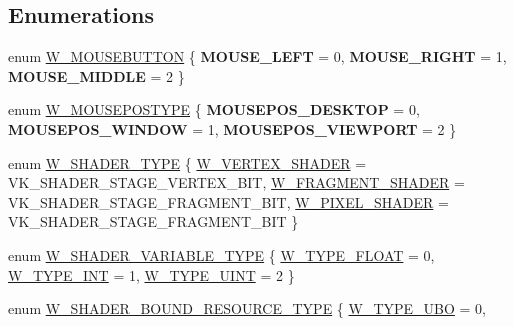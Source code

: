 \subsection*{Enumerations}
\begin{DoxyCompactItemize}
\item 
enum \hyperlink{group__engineclass_ga9e78ddd4770694b21c0d4b852e9c800e}{W\+\_\+\+M\+O\+U\+S\+E\+B\+U\+T\+T\+ON} \{ {\bfseries M\+O\+U\+S\+E\+\_\+\+L\+E\+FT} = 0, 
{\bfseries M\+O\+U\+S\+E\+\_\+\+R\+I\+G\+HT} = 1, 
{\bfseries M\+O\+U\+S\+E\+\_\+\+M\+I\+D\+D\+LE} = 2
 \}
\item 
enum \hyperlink{group__engineclass_ga6b8628ac07d789a9caf635eb23728d04}{W\+\_\+\+M\+O\+U\+S\+E\+P\+O\+S\+T\+Y\+PE} \{ {\bfseries M\+O\+U\+S\+E\+P\+O\+S\+\_\+\+D\+E\+S\+K\+T\+OP} = 0, 
{\bfseries M\+O\+U\+S\+E\+P\+O\+S\+\_\+\+W\+I\+N\+D\+OW} = 1, 
{\bfseries M\+O\+U\+S\+E\+P\+O\+S\+\_\+\+V\+I\+E\+W\+P\+O\+RT} = 2
 \}
\item 
enum \hyperlink{group__engineclass_ga8a79e4a3a441c88450e176150102c7b7}{W\+\_\+\+S\+H\+A\+D\+E\+R\+\_\+\+T\+Y\+PE} \{ \hyperlink{group__engineclass_gga8a79e4a3a441c88450e176150102c7b7a931690c7bb781b1a1c0cfac827e2cacf}{W\+\_\+\+V\+E\+R\+T\+E\+X\+\_\+\+S\+H\+A\+D\+ER} = V\+K\+\_\+\+S\+H\+A\+D\+E\+R\+\_\+\+S\+T\+A\+G\+E\+\_\+\+V\+E\+R\+T\+E\+X\+\_\+\+B\+IT, 
\hyperlink{group__engineclass_gga8a79e4a3a441c88450e176150102c7b7aff8fd7a9b753adb4f08ef1568b31cc88}{W\+\_\+\+F\+R\+A\+G\+M\+E\+N\+T\+\_\+\+S\+H\+A\+D\+ER} = V\+K\+\_\+\+S\+H\+A\+D\+E\+R\+\_\+\+S\+T\+A\+G\+E\+\_\+\+F\+R\+A\+G\+M\+E\+N\+T\+\_\+\+B\+IT, 
\hyperlink{group__engineclass_gga8a79e4a3a441c88450e176150102c7b7a5ad83b2bdd13115508520d7362884105}{W\+\_\+\+P\+I\+X\+E\+L\+\_\+\+S\+H\+A\+D\+ER} = V\+K\+\_\+\+S\+H\+A\+D\+E\+R\+\_\+\+S\+T\+A\+G\+E\+\_\+\+F\+R\+A\+G\+M\+E\+N\+T\+\_\+\+B\+IT
 \}
\item 
enum \hyperlink{group__engineclass_gaeca2b79f62ba669ae9c5dbc516b66522}{W\+\_\+\+S\+H\+A\+D\+E\+R\+\_\+\+V\+A\+R\+I\+A\+B\+L\+E\+\_\+\+T\+Y\+PE} \{ \hyperlink{group__engineclass_ggaeca2b79f62ba669ae9c5dbc516b66522ae4539d4f3784b6d80f44e9dd4867fa00}{W\+\_\+\+T\+Y\+P\+E\+\_\+\+F\+L\+O\+AT} = 0, 
\hyperlink{group__engineclass_ggaeca2b79f62ba669ae9c5dbc516b66522a0bac51e72d76cf1ad3bf0f3253492cba}{W\+\_\+\+T\+Y\+P\+E\+\_\+\+I\+NT} = 1, 
\hyperlink{group__engineclass_ggaeca2b79f62ba669ae9c5dbc516b66522a0781e52e28b630b71af9c730d9f53572}{W\+\_\+\+T\+Y\+P\+E\+\_\+\+U\+I\+NT} = 2
 \}
\item 
enum \hyperlink{group__engineclass_ga6f7d88d2bbec56561a4b13c4e6604893}{W\+\_\+\+S\+H\+A\+D\+E\+R\+\_\+\+B\+O\+U\+N\+D\+\_\+\+R\+E\+S\+O\+U\+R\+C\+E\+\_\+\+T\+Y\+PE} \{ \hyperlink{group__engineclass_gga6f7d88d2bbec56561a4b13c4e6604893af36b467046e1fae5dff40f5a2c15162c}{W\+\_\+\+T\+Y\+P\+E\+\_\+\+U\+BO} = 0, 

\end{DoxyCompactItemize}
